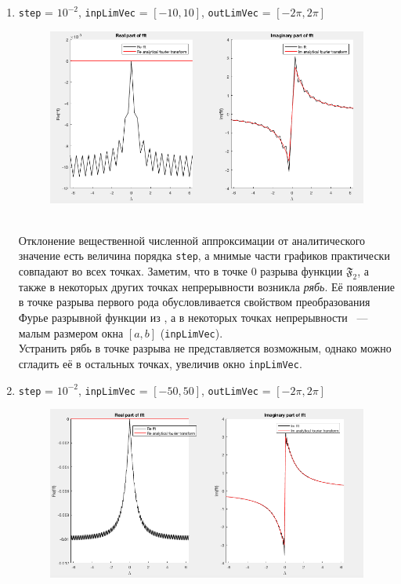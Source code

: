 \documentclass[11pt, oneside, final]{article}
\numberwithin{equation}{section}
\begin{document}
    \begin{enumerate}
        \item
        \label{it:noise}
        \texttt{step} = \(10^{-2}\), \texttt{inpLimVec} = \( [-10, 10] \), \texttt{outLimVec} = \( [-2\pi, 2\pi] \)
        \begin{figure}[!h]
            \centering
            \includegraphics[width=\linewidth]{f2fig1}
            \label{pic:f2:1}
        \end{figure} \\
        Отклонение вещественной численной аппроксимации от аналитического значение есть величина порядка \texttt{step},
        а мнимые части графиков практически совпадают во всех точках.
        Заметим, что в точке 0 разрыва функции \(\mathfrak{F_2}\), а также в некоторых других точках непрерывности возникла \emph{рябь}.
        Её появление в точке разрыва первого рода обусловливается свойством преобразования Фурье разрывной функции из \cite{Roublev:fourier},
        а в некоторых точках непрерывности ~--- малым размером окна \([a, b]\) (\texttt{inpLimVec}).\\
        Устранить рябь в точке разрыва не представляется возможным, однако можно сгладить её в остальных точках, увеличив окно \texttt{inpLimVec}.
        \clearpage
        \item
        \label{it:lessnoise}
        \texttt{step} = \(10^{-2}\), \texttt{inpLimVec} = \( [-50, 50] \), \texttt{outLimVec} = \( [-2\pi, 2\pi] \)
        \begin{figure}[!h]
            \centering
            \includegraphics[width=\linewidth]{f2fig2}

\end{figure}
\end{enumerate}
\end{document}
